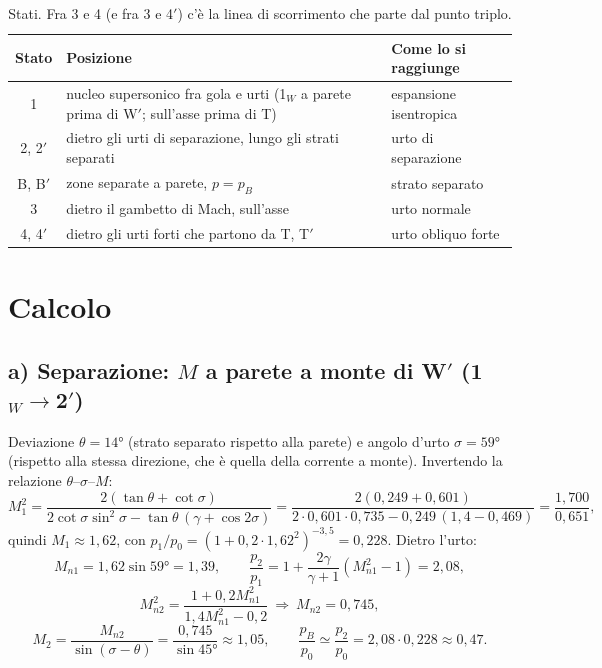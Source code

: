 \documentclass[11pt,a4paper]{article}
\begin{document}
\begin{table}[H]
  \centering
  \small
  \begin{tabular}{cp{6.4cm}p{5.6cm}}
    \toprule
    Stato & Posizione & Come lo si raggiunge \\
    \midrule
    1 & nucleo supersonico fra gola e urti (1$_W$ a parete prima di W$'$; sull'asse prima di T) & espansione
    isentropica \\
    2, 2$'$ & dietro gli urti di separazione, lungo gli strati separati & urto di separazione \\
    B, B$'$ & zone separate a parete, $p=p_B$ & strato separato \\
    3 & dietro il gambetto di Mach, sull'asse & urto normale \\
    4, 4$'$ & dietro gli urti forti che partono da T, T$'$ & urto obliquo forte \\
    \bottomrule
  \end{tabular}
  \caption{Stati. Fra 3 e 4 (e fra 3 e 4$'$) c'è la linea di scorrimento che parte dal punto triplo.}
\end{table}

\section{Calcolo}

\subsection*{a) Separazione: $M$ a parete a monte di W$'$ (1$_W\to$2$'$)}
Deviazione $\theta=\ang{14}$ (strato separato rispetto alla parete) e angolo d'urto $\sigma=\ang{59}$ (rispetto alla
stessa direzione, che è quella della corrente a monte). Invertendo la relazione $\theta$--$\sigma$--$M$:
\[
M_1^2=\frac{2(\tan\theta+\cot\sigma)}{2\cot\sigma\sin^2\sigma-\tan\theta\,(\gamma+\cos2\sigma)}
=\frac{2(0{,}249+0{,}601)}{2\cdot0{,}601\cdot0{,}735-0{,}249\,(1{,}4-0{,}469)}=\frac{1{,}700}{0{,}651},
\]
quindi $M_1\approx1{,}62$,
con $p_1/p_0=(1+0{,}2\cdot1{,}62^2)^{-3{,}5}=0{,}228$. Dietro l'urto:
\[
M_{n1}=1{,}62\sin\ang{59}=1{,}39,\qquad \frac{p_2}{p_1}=1+\frac{2\gamma}{\gamma+1}(M_{n1}^2-1)=2{,}08,
\]
\[
M_{n2}^2=\frac{1+0{,}2M_{n1}^2}{1{,}4M_{n1}^2-0{,}2}\ \Rightarrow\ M_{n2}=0{,}745,
\]
\[
M_2=\frac{M_{n2}}{\sin(\sigma-\theta)}=\frac{0{,}745}{\sin\ang{45}}\approx1{,}05,\qquad
\frac{p_B}{p_0}\simeq\frac{p_2}{p_0}=2{,}08\cdot0{,}228\approx0{,}47 .
\]
\end{document}
